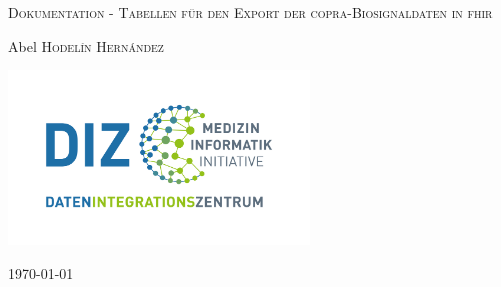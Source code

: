 \begin{titlepage}
	\thispagestyle{firstpage}
	
	\centering
	{\scshape\LARGE Dokumentation - Tabellen für den Export der \acs{copra}-Biosignaldaten in \acs{fhir} \par} 
	\vspace{1.5cm}
		\vspace{2cm}
	{\Large Abel \textsc{Hodelín Hernández}\par} 
	\vspace{2cm}
	\includegraphics[width=8cm]{figures/diz}
	\vfill
	{\large \today\par}
	
\end{titlepage}